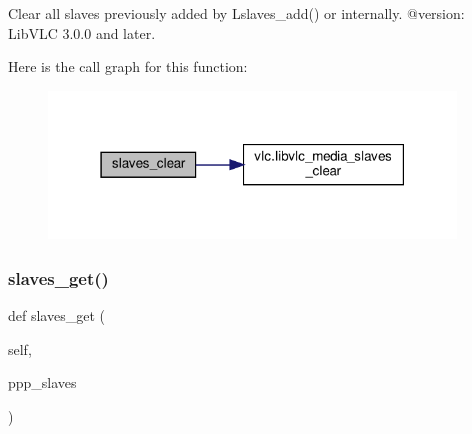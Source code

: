 \begin{DoxyVerb}Clear all slaves previously added by L{slaves_add}() or
internally.
@version: LibVLC 3.0.0 and later.
\end{DoxyVerb}
 Here is the call graph for this function\+:
\nopagebreak
\begin{figure}[H]
\begin{center}
\leavevmode
\includegraphics[width=307pt]{classvlc_1_1_media_a817ad40337d0e94ee7fffaa07b93d40a_cgraph}
\end{center}
\end{figure}
\mbox{\label{classvlc_1_1_media_a895c439fea0ce42b559aca5624857490}} 
\subsubsection{\texorpdfstring{slaves\+\_\+get()}{slaves\_get()}}
{\footnotesize\ttfamily def slaves\+\_\+get (\begin{DoxyParamCaption}\item[{}]{self,  }\item[{}]{ppp\+\_\+slaves }\end{DoxyParamCaption})}

